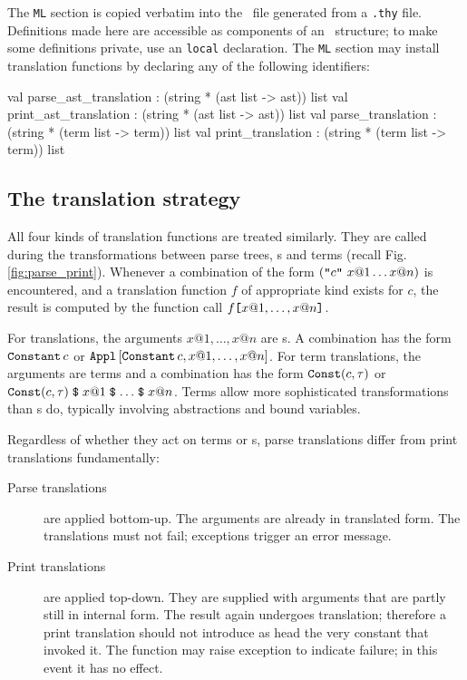 The {\tt ML} section is copied verbatim into the \ML\ file generated from a
{\tt .thy} file.  Definitions made here are accessible as components of an
\ML\ structure; to make some definitions private, use an \ML{} {\tt local}
declaration.  The {\tt ML} section may install translation functions by
declaring any of the following identifiers:
\begin{ttbox}
val parse_ast_translation : (string * (ast list -> ast)) list
val print_ast_translation : (string * (ast list -> ast)) list
val parse_translation     : (string * (term list -> term)) list
val print_translation     : (string * (term list -> term)) list
\end{ttbox}

\subsection{The translation strategy}
All four kinds of translation functions are treated similarly.  They are
called during the transformations between parse trees, \AST{}s and terms
(recall Fig.\ts\ref{fig:parse_print}).  Whenever a combination of the form
$(\mbox{\tt "}c\mbox{\tt "}~x@1 \ldots x@n)$ is encountered, and a translation function
$f$ of appropriate kind exists for $c$, the result is computed by the \ML{}
function call $f \mbox{\tt [} x@1, \ldots, x@n \mbox{\tt ]}$.

For \AST{} translations, the arguments $x@1, \ldots, x@n$ are \AST{}s.  A
combination has the form $\mathop{\mbox{\tt Constant}}\nolimits c$ or $\mathop{\mbox{\tt Appl}}\nolimits\,[\mathop{\mbox{\tt Constant}}\nolimits c, x@1, \ldots,
  x@n]$.  For term translations, the arguments are terms and a combination
has the form $\mathop{\mbox{\tt Const}}\nolimits (c, \tau)$ or $\mathop{\mbox{\tt Const}}\nolimits (c, \tau) \mathrel{\hbox{\tt\$}}
x@1 \mathrel{\hbox{\tt\$}} \ldots \mathrel{\hbox{\tt\$}} x@n$.  Terms allow more sophisticated
transformations than \AST{}s do, typically involving abstractions and bound
variables.

Regardless of whether they act on terms or \AST{}s,
parse translations differ from print translations fundamentally:
\begin{description}
\item[Parse translations] are applied bottom-up.  The arguments are already
  in translated form.  The translations must not fail; exceptions trigger
  an error message.

\item[Print translations] are applied top-down.  They are supplied with
  arguments that are partly still in internal form.  The result again
  undergoes translation; therefore a print translation should not introduce
  as head the very constant that invoked it.  The function may raise
  exception  to indicate failure; in this event it has no
  effect.
\end{description}

